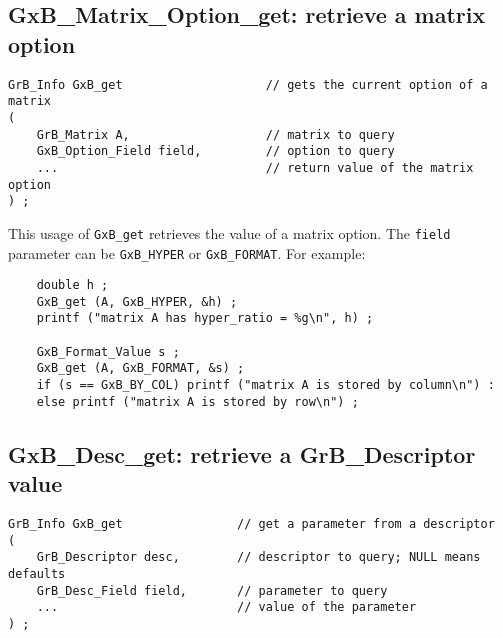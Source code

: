 \documentclass[12pt]{article}
\begin{document}
\subsection{{\sf GxB\_Matrix\_Option\_get:} retrieve a matrix option}

\begin{mdframed}[userdefinedwidth=6in]
{\footnotesize
\begin{verbatim}
GrB_Info GxB_get                    // gets the current option of a matrix
(
    GrB_Matrix A,                   // matrix to query
    GxB_Option_Field field,         // option to query
    ...                             // return value of the matrix option
) ;
\end{verbatim} } \end{mdframed}

This usage of \verb'GxB_get' retrieves the value of a matrix option.
The \verb'field' parameter can be \verb'GxB_HYPER' or \verb'GxB_FORMAT'.
For example:

{\footnotesize
\begin{verbatim}
    double h ;
    GxB_get (A, GxB_HYPER, &h) ;
    printf ("matrix A has hyper_ratio = %g\n", h) ;

    GxB_Format_Value s ;
    GxB_get (A, GxB_FORMAT, &s) ;
    if (s == GxB_BY_COL) printf ("matrix A is stored by column\n") :
    else printf ("matrix A is stored by row\n") ; \end{verbatim} }

\subsection{{\sf GxB\_Desc\_get:} retrieve a {\sf GrB\_Descriptor} value}

\begin{mdframed}[userdefinedwidth=6in]
{\footnotesize
\begin{verbatim}
GrB_Info GxB_get                // get a parameter from a descriptor
(
    GrB_Descriptor desc,        // descriptor to query; NULL means defaults
    GrB_Desc_Field field,       // parameter to query
    ...                         // value of the parameter
) ;
\end{verbatim} } \end{mdframed}
\end{document}
